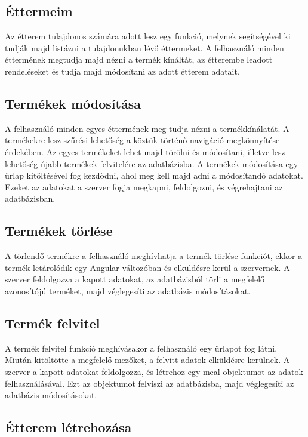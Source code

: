 \subsection{Éttermeim}

Az étterem tulajdonos számára adott lesz egy funkció, melynek segítségével ki tudják majd listázni a tulajdonukban lévő éttermeket. A felhasználó minden éttermének megtudja majd nézni a termék kínáltát, az étterembe leadott rendeléseket és tudja majd módosítani az adott étterem adatait.

\subsection{Termékek módosítása}

A felhasználó minden egyes éttermének meg tudja nézni a termékkínálatát. A termékekre lesz szűrési lehetőség a köztük történő navigáció megkönnyítése érdekében. Az egyes termékeket lehet majd törölni és módosítani, illetve lesz lehetőség újabb termékek felvitelére az adatbázisba.
A termékek módosítása egy űrlap kitöltésével fog kezdődni, ahol meg kell majd adni a módosítandó adatokat. Ezeket az adatokat a szerver fogja megkapni, feldolgozni, és végrehajtani az adatbázisban.

\subsection{Termékek törlése}

A törlendő termékre a felhasználó meghívhatja a termék törlése funkciót, ekkor a termék letárolódik egy Angular változóban és elküldésre kerül a szervernek. A szerver feldolgozza a kapott adatokat, az adatbázisból törli a megfelelő azonosítójú terméket, majd véglegesíti az adatbázis módosításokat.

\subsection{Termék felvitel}

A termék felvitel funkció meghívásakor a felhasználó egy űrlapot fog látni. Miután kitöltötte a megfelelő mezőket, a felvitt adatok elküldésre kerülnek. A szerver a kapott adatokat feldolgozza, és létrehoz egy meal objektumot az adatok felhasználásával. Ezt az objektumot felviszi az adatbázisba, majd véglegesíti az adatbázis módosításokat.

\subsection{Étterem létrehozása}

